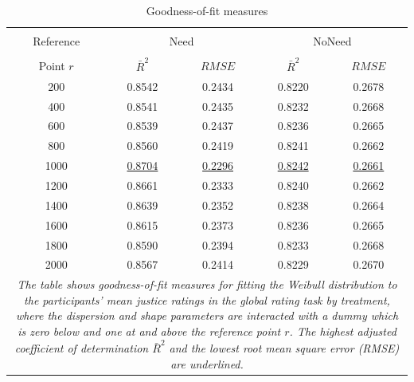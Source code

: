 \documentclass[12pt]{scrartcl}
\begin{document}
\clearpage
\begin{table}[h!t!]
   \centering
   \caption{Goodness-of-fit measures}\label{tab:goodness}
   \begin{tabular}{ccccc}                                                                                     \hline\\[-2ex]
      Reference   & \multicolumn{2}{c}{Need}                    & \multicolumn{2}{c}{NoNeed}                  \\\cline{2-5}\\[-2ex]
      Point $r$   & $\bar{R}^2$          & $RMSE$               & $\bar{R}^2$          & $RMSE$               \\\hline\hline
       200        & 0.8542               & 0.2434               & 0.8220               & 0.2678               \\
       400        & 0.8541               & 0.2435               & 0.8232               & 0.2668               \\
       600        & 0.8539               & 0.2437               & 0.8236               & 0.2665               \\
       800        & 0.8560               & 0.2419               & 0.8241               & 0.2662               \\
      1000        & \underline{0.8704}   & \underline{0.2296}   & \underline{0.8242}   & \underline{0.2661}   \\
      1200        & 0.8661               & 0.2333               & 0.8240               & 0.2662               \\
      1400        & 0.8639               & 0.2352               & 0.8238               & 0.2664               \\
      1600        & 0.8615               & 0.2373               & 0.8236               & 0.2665               \\
      1800        & 0.8590               & 0.2394               & 0.8233               & 0.2668               \\
      2000        & 0.8567               & 0.2414               & 0.8229               & 0.2670               \\\hline
      \multicolumn{5}{p{8.7cm}}{\footnotesize\textit{The table shows goodness-of-fit measures for fitting the Weibull distribution to the participants' mean justice ratings in the global rating task by treatment, where the dispersion and shape parameters are interacted with a dummy which is zero below and one at and above the reference point $r$. The highest adjusted coefficient of determination $\bar{R}^2$ and the lowest root mean square error (RMSE) are underlined.}}
   \end{tabular}
\end{table}
\end{document}
